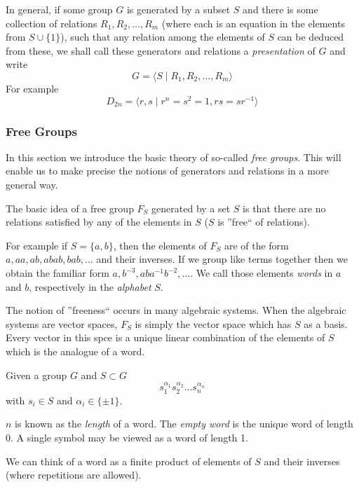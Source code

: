 In general, if some group \(G\) is generated by a subset \(S\) and there is some collection of relations \(R_1, R_2, \ldots, R_m\) (where each is an equation in the elements from \(S \cup \{1\}\)), such that any relation among the elements of \(S\) can be deduced from these, we shall call these generators and relations a \emph{presentation} of \(G\) and write
\[G = \langle S \mid R_1, R_2, \ldots, R_m \rangle\]
For example
\[D_{2n} = \langle r, s \mid r^n = s^2 = 1, rs = sr^{-1}\rangle\]

\subsubsection{Free Groups}
In this section we introduce the basic theory of so-called \emph{free groups}.
This will enable us to make precise the notions of generators and relations in a more general way.

The basic idea of a free group \(F_S\) generated by a set \(S\) is that there are no relations satisfied by any of the elements in \(S\) (\(S\) is ''free`` of relations).

For example if \(S = \{a, b\}\), then the elements of \(F_S\) are of the form \(a, aa, ab, abab, bab, \ldots\) and their inverses.
If we group like terms together then we obtain the familiar form \(a, b^{-3}, aba^{-1}b^{-2}, \ldots\).
We call those elements \emph{words} in \(a\) and \(b\), respectively in the \emph{alphabet} \(S\).

The notion of ''freeness`` occurs in many algebraic systems.
When the algebraic systems are vector spaces, \(F_S\) is simply the vector space which has \(S\) as a basis.
Every vector in this spce is a unique linear combination of the elements of \(S\) which is the analogue of a word.

\begin{definition}[Word]
   Given a group \(G\) and \(S \subset G\)
   \[s_1^{\alpha_1}s_2^{\alpha_2}\ldots s_n^{\alpha_n}\]
   with \(s_i \in S\) and \(\alpha_i \in \{\pm 1\}\).
\end{definition}
\begin{remark}[Terminology]
   \(n\) is known as the \emph{length} of a word.
   The \emph{empty word} is the unique word of length 0.
   A single symbol may be viewed as a word of length 1.
\end{remark}
\begin{remark}[Intuition]
   We can think of a word as a finite product of elements of \(S\) and their inverses (where repetitions are allowed).
\end{remark}


